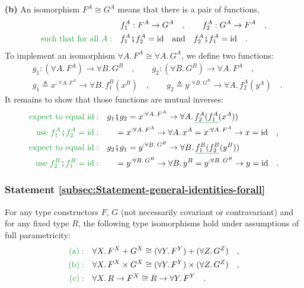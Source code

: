 \textbf{(b)} An isomorphism $F^{A}\cong G^{A}$ means that there is
a pair of functions,
\begin{align*}
 & f_{1}^{A}:F^{A}\rightarrow G^{A}\quad,\quad\quad f_{2}^{A}:G^{A}\rightarrow F^{A}\quad,\\
{\color{greenunder}\text{such that for all }A:}\quad & f_{1}^{A}\bef f_{2}^{A}=\text{id}\quad\text{and}\quad f_{2}^{A}\bef f_{1}^{A}=\text{id}\quad.
\end{align*}
To implement an isomorphism $\forall A.\,F^{A}\cong\forall A.\,G^{A}$,
we define two functions:
\begin{align*}
 & g_{1}:(\forall A.\,F^{A})\rightarrow\forall B.\,G^{B}\quad,\quad\quad g_{2}:(\forall B.\,G^{B})\rightarrow\forall A.\,F^{A}\quad,\\
 & g_{1}\triangleq x^{:\forall A.\,F^{A}}\rightarrow\forall B.\,f_{1}^{B}(x^{B})\quad,\quad\quad g_{2}\triangleq y^{:\forall B.\,G^{B}}\rightarrow\forall A.\,f_{2}^{A}(y^{A})\quad.
\end{align*}
It remains to show that those functions are mutual inverses:
\begin{align*}
{\color{greenunder}\text{expect to equal }\text{id}:}\quad & g_{1}\bef g_{2}=x^{:\forall A.\,F^{A}}\rightarrow\forall A.\,\gunderline{f_{2}^{A}(f_{1}^{A}}(x^{A}))\\
{\color{greenunder}\text{use }f_{1}^{A}\bef f_{2}^{A}=\text{id}:}\quad & \quad=x^{:\forall A.\,F^{A}}\rightarrow\forall A.\,x^{A}=x^{:\forall A.\,F^{A}}\rightarrow x=\text{id}\quad,\\
{\color{greenunder}\text{expect to equal }\text{id}:}\quad & g_{2}\bef g_{1}=y^{:\forall B.\,G^{B}}\rightarrow\forall B.\,\gunderline{f_{1}^{B}(f_{2}^{B}}(y^{B}))\\
{\color{greenunder}\text{use }f_{2}^{B}\bef f_{1}^{B}=\text{id}:}\quad & \quad=y^{:\forall B.\,G^{B}}\rightarrow\forall B.\,y^{B}=y^{:\forall B.\,G^{B}}\rightarrow y=\text{id}\quad.
\end{align*}


\subsubsection{Statement \label{subsec:Statement-general-identities-forall}\ref{subsec:Statement-general-identities-forall}}

For any type constructors $F$, $G$ (not necessarily covariant or
contravariant) and for any fixed type $R$, the following type isomorphisms
hold under assumptions of full parametricity:
\begin{align*}
{\color{greenunder}\text{(a)}:}\quad & \forall X.\,F^{X}+G^{X}\cong(\forall Y.\,F^{Y})+(\forall Z.\,G^{Z})\quad,\\
{\color{greenunder}\text{(b)}:}\quad & \forall X.\,F^{X}\times G^{X}\cong(\forall Y.\,F^{Y})\times(\forall Z.\,G^{Z})\quad,\\
{\color{greenunder}\text{(c)}:}\quad & \forall X.\,R\rightarrow F^{X}\cong R\rightarrow\forall Y.\,F^{Y}\quad.
\end{align*}


